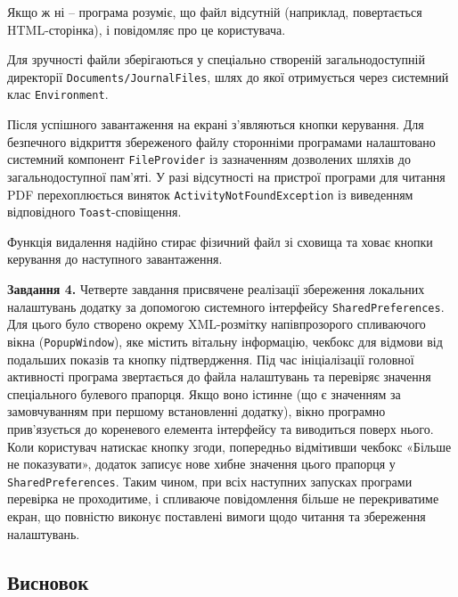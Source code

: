 \documentclass[14pt, a4paper]{extreport}
\begin{document}
	
	Якщо ж ні -- програма розуміє, що файл відсутній (наприклад, повертається HTML-сторінка), і повідомляє про це користувача. 
	
	
	Для зручності файли зберігаються у спеціально створеній загальнодоступній директорії \texttt{Documents/JournalFiles}, шлях до якої отримується через системний клас \texttt{Environment}. 
	
	
	Після успішного завантаження на екрані з'являються кнопки керування. Для безпечного відкриття збереженого файлу сторонніми програмами налаштовано системний компонент \texttt{FileProvider} із зазначенням дозволених шляхів до загальнодоступної пам'яті. У разі відсутності на пристрої програми для читання PDF перехоплюється виняток \texttt{ActivityNotFoundException} із виведенням відповідного \texttt{Toast}-сповіщення. 
	
	
	Функція видалення надійно стирає фізичний файл зі сховища та ховає кнопки керування до наступного завантаження.
	
	
	\textbf{Завдання 4.} Четверте завдання присвячене реалізації збереження локальних налаштувань додатку за допомогою системного інтерфейсу \texttt{SharedPreferences}. Для цього було створено окрему XML-розмітку напівпрозорого спливаючого вікна (\texttt{PopupWindow}), яке містить вітальну інформацію, чекбокс для відмови від подальших показів та кнопку підтвердження. Під час ініціалізації головної активності програма звертається до файла налаштувань та перевіряє значення спеціального булевого прапорця. Якщо воно істинне (що є значенням за замовчуванням при першому встановленні додатку), вікно програмно прив'язується до кореневого елемента інтерфейсу та виводиться поверх нього. Коли користувач натискає кнопку згоди, попередньо відмітивши чекбокс «Більше не показувати», додаток записує нове хибне значення цього прапорця у \texttt{SharedPreferences}. Таким чином, при всіх наступних запусках програми перевірка не проходитиме, і спливаюче повідомлення більше не перекриватиме екран, що повністю виконує поставлені вимоги щодо читання та збереження налаштувань.
	
	
	\subsection*{Висновок}
	
\end{document}
